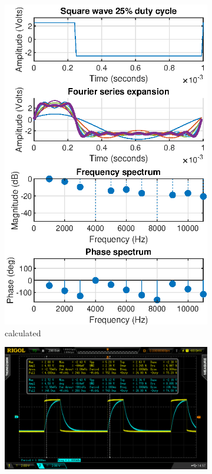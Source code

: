 \documentclass[notitlepage, a4paper, 11pt]{article}
\begin{document}
	\begin{figure}[H]
		\centering
		\begin{subfigure}[][][t]{0.3\textwidth}
			\includegraphics[width=\textwidth]{../Matlab/img/sqr25}
			\caption{calculated}
			\label{fig:calc-signals-c}
		\end{subfigure}
		\quad
		\begin{subfigure}[][][t]{0.3\textwidth}
			\includegraphics[width=\textwidth, trim=85 50 112 45, clip]{../img/osc/DS2_QuickPrint3.png}

\end{subfigure}
\end{figure}
\end{document}
